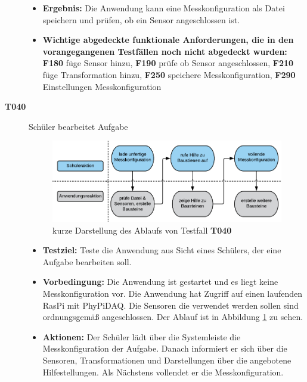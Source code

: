 \documentclass[parskip=full]{scrartcl}
\begin{document}
\begin{description}
\begin{itemize}
\item []\textbf{Ergebnis:} Die Anwendung kann eine Messkonfiguration als Datei speichern und prüfen, ob ein Sensor angeschlossen ist.
\item []\textbf{Wichtige abgedeckte funktionale Anforderungen, die in den vorangegangenen Testfällen noch nicht abgedeckt wurden:} \textbf{F180} füge Sensor hinzu, \textbf{F190} prüfe ob Sensor angeschlossen, \textbf{F210} füge Transformation hinzu, \textbf{F250} speichere Messkonfiguration, \textbf{F290} Einstellungen Messkonfiguration 

\end{itemize}

\item[\textbf{T040}] Schüler bearbeitet Aufgabe

\begin{figure}[htbp]
	\begin{center}
		\includegraphics[width = 13cm]{Grafik/T040-Ablauf.png}
		\caption{kurze Darstellung des Ablaufs von Testfall \textbf{T040}}
		\label{T040-Ablauf}
	\end{center}
\end{figure}
\begin{itemize}

\item []\textbf{Testziel:} Teste die Anwendung aus Sicht eines Schülers, der eine Aufgabe bearbeiten soll.

\item []\textbf{Vorbedingung:} Die Anwendung ist gestartet und es liegt keine Messkonfiguration vor. Die Anwendung hat Zugriff auf einen laufenden \gls{RasPi} mit \gls{PhyPiDAQ}. Die Sensoren die verwendet werden sollen sind ordnungsgemäß angeschlossen. Der Ablauf ist in Abbildung \ref{T040-Ablauf} zu sehen.

\item []\textbf{Aktionen:} Der Schüler lädt über die Systemleiste die Messkonfiguration der Aufgabe. Danach informiert er sich über die Sensoren, Transformationen und Darstellungen über die angebotene Hilfestellungen. Als Nächstens vollendet er die Messkonfiguration.
 

\end{itemize}
\end{description}
\end{document}
